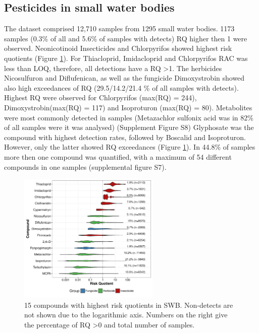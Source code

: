 \documentclass[journal=esthag,manuscript=article]{achemso}
\begin{document}
\subsection{Pesticides in small water bodies}
The dataset comprised 12,710 samples from 1295 small water bodies.
1173 samples (0.3\% of all and 5.6\% of samples with detects) RQ higher then 1 were observed.
Neonicotinoid Insecticides and Chlorpyrifos showed highest risk quotients (Figure \ref{fig:fig6}).
For Thiacloprid, Imidacloprid and Chlorpyrifos RAC was less than LOQ, therefore, all detections have a RQ \textgreater 1. 
The herbicides Nicosulfuron and Diflufenican, as well as the fungicide Dimoxystrobin showed also high exceedances of RQ (29.5/14.2/21.4 \% of all samples with detects).
Highest RQ were observed for Chlorpyrifos (max(RQ) = 244), Dimoxystrobin(max(RQ) = 117) and Isoproturon (max(RQ) = 80). 
Metabolites were most commonly detected in samples (Metazachlor sulfonix acid was in 82\% of all samples were it was analysed) (Supplement Figure S8)
Glyphosate was the compound with highest detection rates, followed by Boscalid and Isoproturon. 
However, only the latter showed RQ exceedances (Figure \ref{fig:fig6}).
In 44.8\% of samples more then one compound was quantified, with a maximum of 54 different compounds in one samples (supplemental figure S7). 

\begin{figure}[h]
  \includegraphics[width=0.6\textwidth]{figure6.pdf}
  \caption{15 compounds with highest risk quotients in SWB. Non-detects are not shown due to the logarithmic axis. Numbers on the right give the percentage of RQ \textgreater 0 and total number of samples.
  }
  \label{fig:fig6}
\end{figure}




\end{document}
